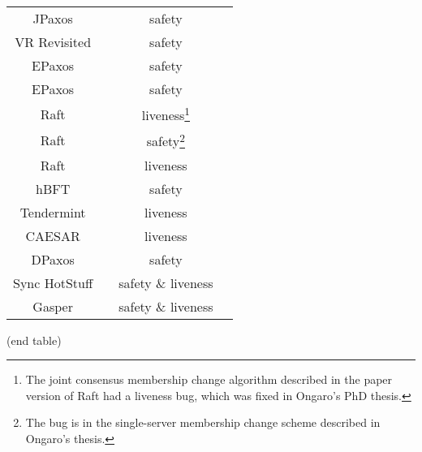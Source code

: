 \documentclass{article}
\begin{document}
\begin{center}
\begin{tabular}{ c c c c }
    JPaxos & \cite{konczakJPaxosStateMachine2011} & safety &
    \cite{michaelRecoveringSharedObjects2017} \\

    VR Revisited & \cite{liskovViewstampedReplicationRevisited2012} & safety &
    \cite{michaelRecoveringSharedObjects2017} \\

    EPaxos & \cite{moraruThereMoreConsensus2013} & safety &
    \cite{sutraCorrectnessEgalitarianPaxos2020} \\

    EPaxos & \cite{moraruThereMoreConsensus2013} & safety &
    \cite{whittakerEPaxosDependencySet2021} \\

    Raft & \cite{ongaroSearchUnderstandableConsensus2014} &
    liveness\footnote{The joint consensus membership change algorithm described
    in the paper version of Raft had a liveness bug, which was fixed in
    Ongaro's PhD thesis.} & \cite{hochConfigurationChanges2014} \\

    Raft & \cite{ongaroConsensusBridgingTheory2014} & safety\footnote{The bug
    is in the single-server membership change scheme described in Ongaro's
    thesis.} & \cite{amos15812TermPaper2015,
    ongaroBugSingleserverMembership2015} \\

    Raft & \cite{ongaroSearchUnderstandableConsensus2014,
    ongaroConsensusBridgingTheory2014} & liveness &
    \cite{howardRaftDoesNot2020, jensenExaminingRaftBehaviour2021} \\

    hBFT & \cite{duanHBFTSpeculativeByzantine2015} & safety &
    \cite{shresthaRevisitingHBFTSpeculative2019} \\

    Tendermint & \cite{buchmanTendermintByzantineFault2016} & liveness &
    \cite{cachinBlockchainConsensusProtocols2017} \\

    CAESAR & \cite{arunSpeedingConsensusChasing2017} & liveness &
    \cite{enesEfficientReplicationTimestamp2021} \\

    DPaxos & \cite{nawabDPaxosManagingData2018} & safety &
    \cite{whittakerMatchmakerPaxosReconfigurable2021} \\

    Sync HotStuff & \cite{abrahamSyncHotStuffSimple2019} & safety \& liveness &
    \cite{momoseForceLockingAttackSync2019} \\

    Gasper & \cite{buterinCombiningGHOSTCasper2020} & safety \& liveness &
    \cite{neuEbbandFlowProtocolsResolution2021} \\

    \bottomrule
\end{tabular}
\end{center}

\begin{center}
    {\footnotesize \color{white} (end table)}
\end{center}

\newpage
\printbibliography
\end{document}
